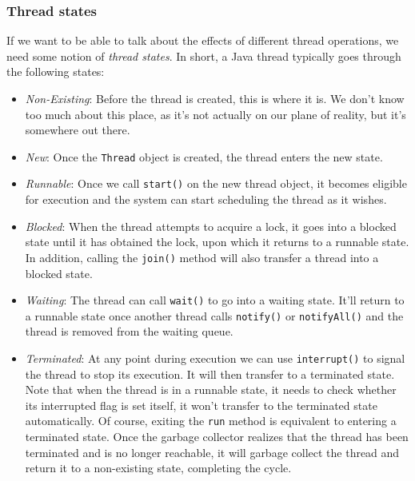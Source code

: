 \documentclass[main]{subfiles}
\begin{document}
\subsubsection{Thread states}
If we want to be able to talk about the effects of different thread operations, we need some notion of \textit{thread states}. In short, a Java thread typically goes through the following states:
\begin{itemize}
    \item \textit{Non-Existing}: Before the thread is created, this is where it is. We don't know too much about this place, as it's not actually on our plane of reality, but it's somewhere out there.
    \item \textit{New}: Once the \texttt{Thread} object is created, the thread enters the new state.
    \item \textit{Runnable}: Once we call \texttt{start()} on the new thread object, it becomes eligible for execution and the system can start scheduling the thread as it wishes.
    \item \textit{Blocked}: When the thread attempts to acquire a lock, it goes into a blocked state until it has obtained the lock, upon which it returns to a runnable state. In addition, calling the \texttt{join()} method will also transfer a thread into a blocked state.
    \item \textit{Waiting}: The thread can call \texttt{wait()} to go into a waiting state. It'll return to a runnable state once another thread calls \texttt{notify()} or \texttt{notifyAll()} and the thread is removed from the waiting queue.
    \item \textit{Terminated}: At any point during execution we can use \texttt{interrupt()} to signal the thread to stop its execution. It will then transfer to a terminated state. Note that when the thread is in a runnable state, it needs to check whether its interrupted flag is set itself, it won't transfer to the terminated state automatically. Of course, exiting the \texttt{run} method is equivalent to entering a terminated state. Once the garbage collector realizes that the thread has been terminated and is no longer reachable, it will garbage collect the thread and return it to a non-existing state, completing the cycle.
\end{itemize}
\end{document}
